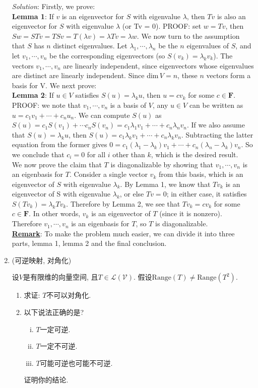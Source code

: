 \documentclass[a4paper]{article}
\begin{document}
\begin{enumerate}
	\emph{Solution}:
	Firstly, we prove:\\
	\textbf{Lemma 1}: If $v$ is an eigenvector for $S$ with eigenvalue $\lambda$, then $Tv$ is also an eigenvector for $S$ with eigenvalue $\lambda$ (or Tv = 0). PROOF: set $w = Tv$, then $Sw = STv = TSv = T(\lambda v) = \lambda Tv = \lambda w$.
	We now turn to the assumption that $S$ has $n$ distinct eigenvalues. Let $\lambda_1, \cdots, \lambda_n$ be the $n$ eigenvalues of $S$, and let $v_1, \cdots, v_n$ be the corresponding eigenvectors (so $S(v_k) = \lambda_k v_k$). The vectors $v_1, \cdots, v_n$ are linearly independent, since eigenvectors whose eigenvalues are distinct are linearly independent. Since dim$\,V = n$, these $n$ vectors form a basis for V. We next prove:\\
	\textbf{Lemma 2}: If $u \in V$ satisfies $S(u) = \lambda_k u$, then $u = cv_k$ for some $c \in \mathbf{F}$. PROOF: we note that $v_1, \cdots, v_n$ is a basis of $V$, any $u \in V$ can be written as $u = c_1 v_1 + \cdots + c_n u_n$. We can compute $S(u)$ as $S(u) = c_1 S(v_1) + \cdots c_n S(v_n) = c_1 \lambda_1 v_1 + \cdots + c_n \lambda_n v_n$. If we also assume that $S(u) = \lambda_k u$, then $S(u) = c_1 \lambda_k v_1 + \cdots + c_n \lambda_k v_n$. Subtracting the latter equation from the former gives $0 = c_1 (\lambda_1 - \lambda_k) v_1 + \cdots + c_n (\lambda_n - \lambda_k)v_n$. So we conclude that $c_i = 0$ for all $i$ other than $k$, which is the desired result.\\
	We now prove the claim that $T$ is diagonalizable by showing that $v_1, \cdots, v_n$ is an eigenbasis for $T$. Consider a single vector $v_k$ from this basis, which is an eigenvector of $S$ with eigenvalue $\lambda_k$. By Lemma 1, we know that $Tv_k$ is an eigenvector of S with eigenvalue $\lambda_k$, or else $Tv = 0$; in either case, it satisfies $S(Tv_k) = \lambda_k Tv_k$. Therefore by Lemma 2, we see that $Tv_k = cv_k$ for some $c \in \mathbf{F}$. In other words, $v_k$ is an eigenvector of $T$ (since it is nonzero). Therefore $v_1, \cdots, v_n$ is an eigenbasis for $T$, so $T$ is diagonalizable.\\
	\textbf{\underline{Remark}}: To make the problem much easier, we can divide it into three parts, lemma 1, lemma 2 and the final conclusion.

	\item (可逆映射, 对角化)

	设$V$是有限维的向量空间, 且$T\in \mathcal{L(V)}$. 假设$\mathrm{Range}(T) \not = \mathrm{Range}(T^2)$.
	\begin{enumerate}[(1)]
		\item 求证: $T$不可以对角化.
		\item 以下说法正确的是?
		\begin{enumerate}[(i)]
			\item $T$一定可逆.
			\item $T$一定不可逆.
			\item $T$可能可逆也可能不可逆.
		\end{enumerate}
		证明你的结论.
		\end{enumerate}
	

\end{enumerate}
\end{document}
